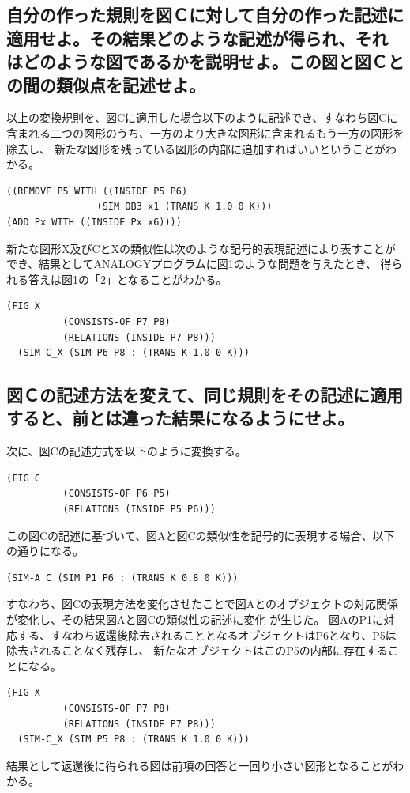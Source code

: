 \documentclass[uplatex]{jsarticle}
\begin{document}
\subsection{自分の作った規則を図Ｃに対して自分の作った記述に適用せよ。その結果どのような記述が得られ、それはどのような図であるかを説明せよ。この図と図Ｃとの間の類似点を記述せよ。}
以上の変換規則を、図Cに適用した場合以下のように記述でき、すなわち図Cに含まれる二つの図形のうち、一方のより大きな図形に含まれるもう一方の図形を除去し、
新たな図形を残っている図形の内部に追加すればいいということがわかる。
\begin{lstlisting}[basicstyle=\ttfamily\footnotesize, frame=single]
((REMOVE P5 WITH ((INSIDE P5 P6)
                (SIM OB3 x1 (TRANS K 1.0 0 K)))
(ADD Px WITH ((INSIDE Px x6))))
\end{lstlisting}
新たな図形X及びCとXの類似性は次のような記号的表現記述により表すことができ、結果としてANALOGYプログラムに図1のような問題を与えたとき、
得られる答えは図1の「2」となることがわかる。

\begin{lstlisting}[basicstyle=\ttfamily\footnotesize, frame=single]
  (FIG X
          (CONSISTS-OF P7 P8)
          (RELATIONS (INSIDE P7 P8)))
  (SIM-C_X (SIM P6 P8 : (TRANS K 1.0 0 K)))
\end{lstlisting}

\subsection{図Ｃの記述方法を変えて、同じ規則をその記述に適用すると、前とは違った結果になるようにせよ。}
次に、図Cの記述方式を以下のように変換する。
\begin{lstlisting}[basicstyle=\ttfamily\footnotesize, frame=single]
  (FIG C
          (CONSISTS-OF P6 P5)
          (RELATIONS (INSIDE P5 P6)))
\end{lstlisting}
この図Cの記述に基づいて、図Aと図Cの類似性を記号的に表現する場合、以下の通りになる。
\begin{lstlisting}[basicstyle=\ttfamily\footnotesize, frame=single]
  (SIM-A_C (SIM P1 P6 : (TRANS K 0.8 0 K)))
\end{lstlisting}
すなわち、図Cの表現方法を変化させたことで図Aとのオブジェクトの対応関係が変化し、その結果図Aと図Cの類似性の記述に変化
が生じた。
図AのP1に対応する、すなわち返還後除去されることとなるオブジェクトはP6となり、P5は除去されることなく残存し、
新たなオブジェクトはこのP5の内部に存在することになる。
\begin{lstlisting}[basicstyle=\ttfamily\footnotesize, frame=single]
  (FIG X
          (CONSISTS-OF P7 P8)
          (RELATIONS (INSIDE P7 P8)))
  (SIM-C_X (SIM P5 P8 : (TRANS K 1.0 0 K)))
\end{lstlisting}
結果として返還後に得られる図は前項の回答と一回り小さい図形となることがわかる。
\end{document}
